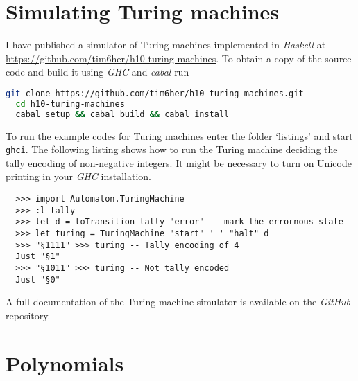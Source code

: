 % 

\section{Simulating Turing machines}%
\label{app:turing}%

I have published a simulator of Turing machines implemented in \emph{Haskell}
at \url{https://github.com/tim6her/h10-turing-machines}. To obtain a copy of
the source code and build it using \emph{GHC} and \emph{cabal} run

\begin{lstlisting}[language=bash]
  git clone https://github.com/tim6her/h10-turing-machines.git
  cd h10-turing-machines
  cabal setup && cabal build && cabal install
\end{lstlisting}

To run the example codes for Turing machines enter the folder ‘listings’ and
start \verb+ghci+. The following listing shows how to run the Turing machine
deciding the tally encoding of non-negative integers. It might be necessary to
turn on Unicode printing in your \emph{GHC} installation.

\begin{lstlisting}
  >>> import Automaton.TuringMachine
  >>> :l tally
  >>> let d = toTransition tally "error" -- mark the errornous state
  >>> let turing = TuringMachine "start" '_' "halt" d
  >>> "§1111" >>> turing -- Tally encoding of 4
  Just "§1"
  >>> "§1011" >>> turing -- Not tally encoded
  Just "§0"
\end{lstlisting}

A full documentation of the Turing machine simulator is available on the
\emph{GitHub} repository.

\section{Polynomials}\label{app:polynomials}

